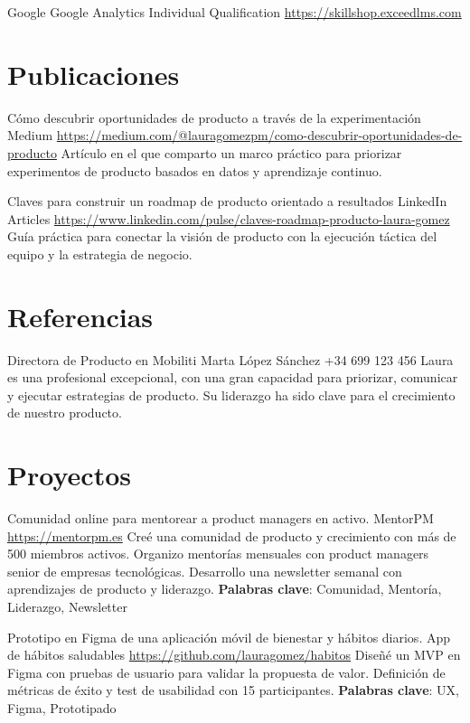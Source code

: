 \documentclass[a4paper, serif, 10pt]{moderncv}
\begin{document}
        {Google}
        {Google Analytics Individual Qualification}
        {\url{https://skillshop.exceedlms.com}}
        {}
        {}
\section{Publicaciones}

        {Cómo descubrir oportunidades de producto a través de la experimentación}
        {Medium}
        {\url{https://medium.com/@lauragomezpm/como-descubrir-oportunidades-de-producto}}
        {}
        {Artículo en el que comparto un marco práctico para priorizar experimentos de producto basados en datos y aprendizaje continuo.}

        {Claves para construir un roadmap de producto orientado a resultados}
        {LinkedIn Articles}
        {\url{https://www.linkedin.com/pulse/claves-roadmap-producto-laura-gomez}}
        {}
        {Guía práctica para conectar la visión de producto con la ejecución táctica del equipo y la estrategia de negocio.}
\section{Referencias}

        {Directora de Producto en Mobiliti}
        {Marta López Sánchez}
        {+34 699 123 456}
        {}
        {Laura es una profesional excepcional, con una gran capacidad para priorizar, comunicar y ejecutar estrategias de producto. Su liderazgo ha sido clave para el crecimiento de nuestro producto.}
\section{Proyectos}

        {Comunidad online para mentorear a product managers en activo.}
        {MentorPM}
        {\url{https://mentorpm.es}}
        {}
        {Creé una comunidad de producto y crecimiento con más de 500 miembros activos.
Organizo mentorías mensuales con product managers senior de empresas tecnológicas.
Desarrollo una newsletter semanal con aprendizajes de producto y liderazgo.
\textbf{Palabras clave}: Comunidad, Mentoría, Liderazgo, Newsletter}

        {Prototipo en Figma de una aplicación móvil de bienestar y hábitos diarios.}
        {App de hábitos saludables}
        {\url{https://github.com/lauragomez/habitos}}
        {}
        {Diseñé un MVP en Figma con pruebas de usuario para validar la propuesta de valor.
Definición de métricas de éxito y test de usabilidad con 15 participantes.
\textbf{Palabras clave}: UX, Figma, Prototipado}
\end{document}
